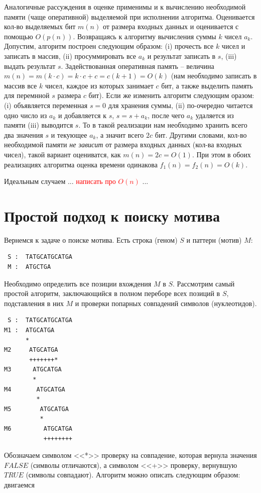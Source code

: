 \documentclass[letterpaper, 11pt]{article}
\begin{document}
Аналогичные рассуждения в оценке применимы и к вычислению необходимой памяти (чаще оперативной) выделяемой
при исполнении алгоритма. Оценивается кол-во выделяемых бит $m(n)$ от размера входных данных и оценивается с помощью
$O(p(n))$. Возвращаясь к алгоритму вычисления суммы $k$ чисел $a_k$. Допустим, алгоритм построен следующим образом: (i) прочесть все $k$ чисел и записать в массив, (ii) просуммировать все $a_k$ и результат записать в $s$, (iii) выдать результат $s$. Задействованная оперативная память -- величина $m(n) = m(k \cdot c) = k \cdot c + c = c(k + 1) = O(k)$ (нам необходимо записать в массив все $k$ чисел, каждое из которых занимает $c$ бит, а также выделить память для перемнной $s$ размера $c$ бит). Если же изменить алгоритм следующим оразом: (i) объявляется переменная $s = 0$ для хранения суммы, (ii) по-очередно читается одно число из $a_k$ и добавляется к $s$, $s = s + a_k$, после чего $a_k$ удаляется из памяти (iii) выводится $s$. То в такой реализации нам необходимо хранить всего два значения $s$ и текующее $a_k$, а значит всего $2c$ бит. Другими словами, кол-во необходимой памяти \textit{не зависит} от размера входных данных (кол-ва входных чисел), такой вариант оцениватся, как $m(n) = 2c = O(1)$. При этом в обоих реализациях алгоритма оценка времени одинакова $f_1(n) = f_2(n) = O(k)$.
\par
Идеальным случаем ... \textcolor{red}{написать про $O(n)$} ...
\section{Простой подход к поиску мотива}
\par
Вернемся к задаче о поиске мотива. Есть строка (геном) $S$ и паттерн (мотив) $M$:
\begin{verbatim}
 S :  TATGCATGCATGA
 M :  ATGCTGA
\end{verbatim}
\par
Необходимо определить все позиции вхождения $M$ в $S$. Рассмотрим самый простой алгоритм, заключающийся в полном переборе всех позиций в $S$, подставления в них $M$ и проверки попарных совпадений символов (нуклеотидов).
\begin{verbatim}
 S :  TATGCATGCATGA
M1 :  ATGCATGA
      * 
M2     ATGCATGA
       +++++++*
M3      ATGCATGA
        *
M4       ATGCATGA
         *
M5        ATGCATGA
          *
M6         ATGCATGA
           ++++++++
\end{verbatim}
\par
Обозначаем символом <<*>> проверку на совпадение, которая вернула значения $FALSE$ (символы отличаются), а символом <<+>> проверку, вернувшую $TRUE$ (символы совпадают). Алгоритм можно описать следующим образом: двигаемся 
\end{document}
